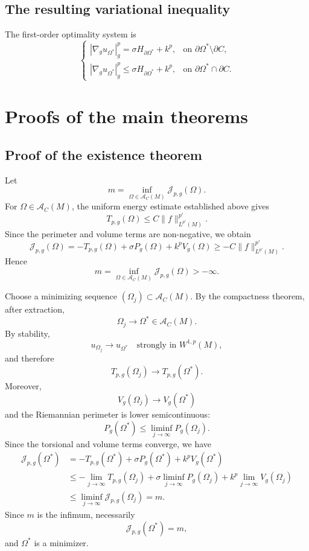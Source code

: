 \documentclass{article}
\renewcommand{\boxed}[1]{#1}
\begin{document}
\subsection{The resulting variational inequality}

The first-order optimality system is
\[
\boxed{
\begin{cases}
|\nabla_g u_{\Omega^\ast}|_g^p
=
\sigma H_{\partial\Omega^\ast}+k^p,
&\text{on }\partial\Omega^\ast\setminus\partial C,\\[1mm]
|\nabla_g u_{\Omega^\ast}|_g^p
\leq
\sigma H_{\partial\Omega^\ast}+k^p,
&\text{on }\partial\Omega^\ast\cap\partial C.
\end{cases}}
\]

\section{Proofs of the main theorems}

\subsection{Proof of the existence theorem}

Let
\[
m=\inf_{\Omega\in \mathcal A_C(M)}\mathcal J_{p,g}(\Omega).
\]
For $\Omega\in \mathcal A_C(M)$, the uniform energy estimate established
above gives
\[
T_{p,g}(\Omega)
\leq
C\|f\|_{L^{p'}(M)}^{p'}.
\]
Since the perimeter and volume terms are non-negative, we obtain
\[
\mathcal J_{p,g}(\Omega)
=
-T_{p,g}(\Omega)+\sigma P_g(\Omega)+k^pV_g(\Omega)
\geq
-C\|f\|_{L^{p'}(M)}^{p'}.
\]
Hence
\[
m=\inf_{\Omega\in\mathcal A_C(M)}\mathcal J_{p,g}(\Omega)>-\infty.
\]

Choose a minimizing sequence $(\Omega_j)\subset \mathcal A_C(M)$. By the compactness
theorem, after extraction,
\[
\Omega_j\to\Omega^\ast\in \mathcal A_C(M).
\]
By stability,
\[
u_{\Omega_j}\to u_{\Omega^\ast}
\quad\text{strongly in }W^{1,p}(M),
\]
and therefore
\[
T_{p,g}(\Omega_j)\to T_{p,g}(\Omega^\ast).
\]
Moreover,
\[
V_g(\Omega_j)\to V_g(\Omega^\ast)
\]
and the Riemannian perimeter is lower semicontinuous:
\[
P_g(\Omega^\ast)
\leq
\liminf_{j\to\infty}P_g(\Omega_j).
\]
Since the torsional and volume terms converge, we have
\[
\begin{aligned}
\mathcal J_{p,g}(\Omega^\ast)
&=-T_{p,g}(\Omega^\ast)+\sigma P_g(\Omega^\ast)
   +k^pV_g(\Omega^\ast)\\
&\leq -\lim_{j\to\infty}T_{p,g}(\Omega_j)
   +\sigma\liminf_{j\to\infty}P_g(\Omega_j)
   +k^p\lim_{j\to\infty}V_g(\Omega_j)\\
&\leq \liminf_{j\to\infty}
   \mathcal J_{p,g}(\Omega_j)
=m.
\end{aligned}
\]
Since $m$ is the infimum, necessarily
\[
\mathcal J_{p,g}(\Omega^\ast)=m,
\]
and $\Omega^\ast$ is a minimizer.
\end{document}
